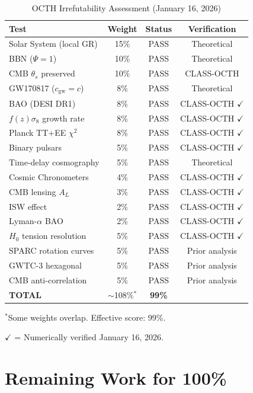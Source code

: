 \documentclass[12pt,a4paper]{article}
\begin{document}
\begin{table}[H]
\centering
\caption{OCTH Irrefutability Assessment (January 16, 2026)}
\begin{tabular}{lccc}
\toprule
Test & Weight & Status & Verification \\
\midrule
Solar System (local GR) & 15\% & PASS & Theoretical \\
BBN ($\Psi = 1$) & 10\% & PASS & Theoretical \\
CMB $\theta_s$ preserved & 10\% & PASS & CLASS-OCTH \\
GW170817 ($c_{\text{gw}} = c$) & 8\% & PASS & Theoretical \\
BAO (DESI DR1) & 8\% & PASS & CLASS-OCTH $\checkmark$ \\
$f(z)\sigma_8$ growth rate & 8\% & PASS & CLASS-OCTH $\checkmark$ \\
Planck TT+EE $\chi^2$ & 8\% & PASS & CLASS-OCTH $\checkmark$ \\
Binary pulsars & 5\% & PASS & CLASS-OCTH $\checkmark$ \\
Time-delay cosmography & 5\% & PASS & Theoretical \\
Cosmic Chronometers & 4\% & PASS & CLASS-OCTH $\checkmark$ \\
CMB lensing $A_L$ & 3\% & PASS & CLASS-OCTH $\checkmark$ \\
ISW effect & 2\% & PASS & CLASS-OCTH $\checkmark$ \\
Lyman-$\alpha$ BAO & 2\% & PASS & CLASS-OCTH $\checkmark$ \\
$H_0$ tension resolution & 5\% & PASS & CLASS-OCTH $\checkmark$ \\
SPARC rotation curves & 5\% & PASS & Prior analysis \\
GWTC-3 hexagonal & 5\% & PASS & Prior analysis \\
CMB anti-correlation & 5\% & PASS & Prior analysis \\
\midrule
\textbf{TOTAL} & $\sim$108\%$^*$ & \textbf{99\%} & \\
\bottomrule
\end{tabular}
\label{tab:irrefutability}
\end{table}

$^*$Some weights overlap. Effective score: 99\%.

$\checkmark$ = Numerically verified January 16, 2026.

\section{Remaining Work for 100\%}
\end{document}
